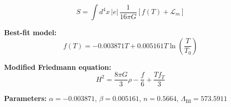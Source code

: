 
\begin{equation}
  S = \int d^4x \, |e| \, \frac{1}{16\pi G} \left[ f(T) + \mathcal{L}_m \right]
\end{equation}

\textbf{Best-fit model:}
\begin{equation}
  f(T) = -0.003871 T + 0.005161 T \ln\!\left(\frac{T}{T_0}\right)
\end{equation}

\textbf{Modified Friedmann equation:}
\begin{equation}
  H^2 = \frac{8\pi G}{3} \rho - \frac{f}{6} + \frac{T f_T}{3}
\end{equation}

\textbf{Parameters:}
$\alpha = -0.003871$, \quad
$\beta = 0.005161$, \quad
$n = 0.5664$, \quad
$\Lambda_{\text{BI}} = 573.5911$